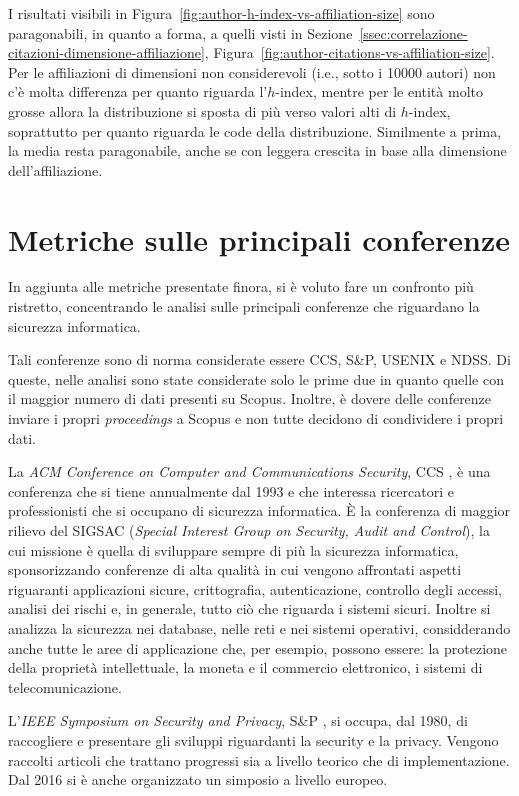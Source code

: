 I risultati visibili in Figura~\ref{fig:author-h-index-vs-affiliation-size}
sono paragonabili, in quanto a forma, a quelli visti in
Sezione~\ref{ssec:correlazione-citazioni-dimensione-affiliazione},
Figura~\ref{fig:author-citations-vs-affiliation-size}.
Per le affiliazioni di dimensioni non considerevoli (i.e., sotto i 10000 autori)
non c'è molta differenza per quanto riguarda l'$h$-index, mentre per le entità
molto grosse allora la distribuzione si sposta di più verso valori alti di
$h$-index, soprattutto per quanto riguarda le code della distribuzione.
Similmente a prima, la media resta paragonabile, anche se con leggera crescita
in base alla dimensione dell'affiliazione.


\section{Metriche sulle principali conferenze}
In aggiunta alle metriche presentate finora, si è voluto fare un confronto più ristretto, concentrando le analisi sulle principali conferenze che riguardano la sicurezza informatica.

Tali conferenze sono di norma considerate essere CCS, S\&P, USENIX e NDSS. Di queste, nelle analisi sono state considerate solo le prime due in quanto quelle con il maggior numero di dati presenti su Scopus. Inoltre, è dovere delle conferenze inviare i propri \textit{proceedings} a Scopus e non tutte decidono di condividere i propri dati.

La \textit{ACM Conference on Computer and Communications Security}, CCS \cite{ccs}, è una conferenza che si tiene annualmente dal 1993 e che interessa ricercatori e professionisti che si occupano di sicurezza informatica. È la conferenza di maggior rilievo del SIGSAC (\textit{Special Interest Group on Security, Audit and Control}), la cui missione è quella di sviluppare sempre di più la sicurezza informatica, sponsorizzando conferenze di alta qualità in cui vengono affrontati aspetti riguaranti applicazioni sicure, crittografia, autenticazione, controllo degli accessi, analisi dei rischi e, in generale, tutto ciò che riguarda i sistemi sicuri. Inoltre si analizza la sicurezza nei database, nelle reti e nei sistemi operativi, considderando anche tutte le aree di applicazione che, per esempio, possono essere: la protezione della proprietà intellettuale, la moneta e il commercio elettronico, i sistemi di telecomunicazione. 

L'\textit{IEEE Symposium on Security and Privacy}, S\&P \cite{SeP}, si occupa, dal 1980, di raccogliere e presentare gli sviluppi riguardanti la security e la privacy. Vengono raccolti articoli che trattano progressi sia a livello teorico che di implementazione. Dal 2016 si è anche organizzato un simposio a livello europeo.

